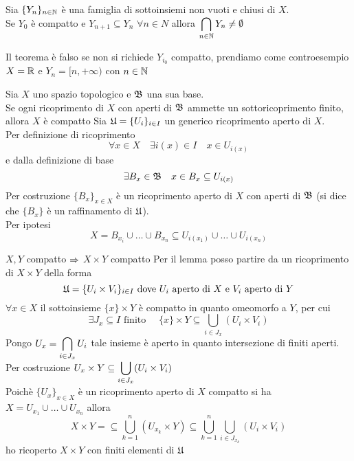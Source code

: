 \begin{cor}Sia $\{ Y_n \}_{n \in \mathbb{N}}$ \`e una famiglia di sottoinsiemi non vuoti  e chiusi di $X$.\\
Se $Y_0$  \`e compatto e $Y_{n+1} \subseteq Y_n$ $\forall n \in N $ allora $\displaystyle \bigcap_{n\in \mathbb{N}} Y_n \neq \emptyset$
\end{cor}
\begin{oss} Il teorema \`e falso se non si richiede $Y_{i_0}$ compatto, prendiamo come controesempio  $X=\mathbb{R}$ e $Y_n=[n,+\infty)$ con $n \in \mathbb{N}$
\end{oss}
\spazio
\begin{thm}Sia $X$ uno spazio topologico e $\mathfrak{B}$ una sua base.\\
Se ogni ricoprimento di $X$ con aperti di $\mathfrak{B}$ ammette un sottoricoprimento finito, allora $X$ \`e compatto
\proof Sia $\mathfrak{U} =\displaystyle \{ U_i\}_{i\in I}$ un generico ricoprimento aperto di $X$.\\
Per definizione di ricoprimento 
$$ \forall x \in X \quad \exists i(x) \in I \quad x \in U_{i(x)}$$
e dalla definizione di base
$$\exists B_x\in \mathfrak{B} \quad x \in B_x \subseteq U_{i(x)}$$
Per costruzione $\{ B_x\}_{x\in X}$ \`e un ricoprimento aperto di $X$ con aperti di $\mathfrak{B}$ (si dice che $\{ B_x\}$ \`e un raffinamento di $\mathfrak{U}$).\\
Per ipotesi 
$$ X= B_{x_i} \cup \dots \cup B_{x_n} \subseteq U_{i(x_1)} \cup \dots \cup U_{i(x_n)}$$
\endproof
\end{thm}
\spazio
\begin{thm}$X,Y$ compatto $\Rightarrow$ $X \times Y$ compatto
\proof Per il lemma posso partire da un ricoprimento di $X\times Y$ della forma
$$ \mathfrak{U} =\{ U_i \times V_i \}_{i \in I} \text{ dove } U_i \text{ aperto di }  X \text{ e } V_i \text{ aperto di } Y$$
$\forall x \in X$ il sottoinsieme $\{ x \} \times Y $ \`e compatto in quanto omeomorfo a $Y$, per cui
$$ \exists J_x \subseteq I \text{ finito } \quad \{ x \} \times Y \subseteq \bigcup_{ i \in J_x} (U_i \times V_i)$$
Pongo $U_x = \displaystyle \bigcap_{i \in J_x} U_i$ tale insieme \`e aperto in quanto intersezione di finiti aperti.\\
Per costruzione $U_x \times Y \subseteq \displaystyle \bigcup_{i \in J_x} (U_i \times V_i)$\\
Poich\`e $\{ U_x\}_{x\in X} $ \`e un ricoprimento aperto di $X$ compatto si ha $X= U_{x_1} \cup \dots \cup U_{x_n}$ allora 
$$ X \times Y = \subseteq \bigcup_{k=1}^n \left( U_{x_k} \times Y \right) \subseteq \bigcup_{k=1}^n \bigcup_{i \in J_{x_k}} ( U_i \times V_i)$$
ho ricoperto $X\times Y$ con finiti elementi di $\mathfrak{U}$\\
\endproof
\end{thm}
